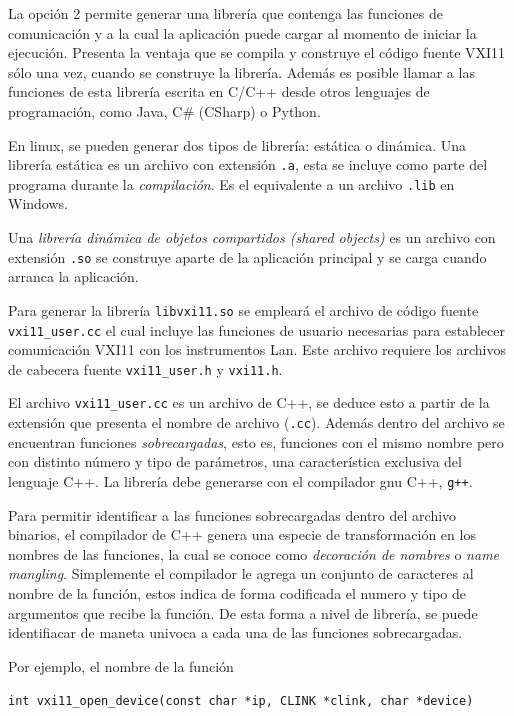 \documentclass[paper=letter,oneside,fontsize=11pt, parskip=full]{scrartcl}
\newenvironment{code}
	{\begin{adjustwidth}{1.0cm}{0.0cm}\ttfamily}
	{\end{adjustwidth}}
\begin{document}
	La opción 2 permite generar una librería que contenga las funciones de comunicación y a la cual la aplicación puede cargar al momento de iniciar la ejecución. Presenta la ventaja que se compila y construye el código fuente VXI11 sólo una vez, cuando se construye la librería. Además es posible llamar a las funciones de esta librería escrita en C/C++ desde otros lenguajes de programación, como Java, C\# (CSharp) o Python.
	
	En linux, se pueden generar dos tipos de librería: estática o dinámica. Una librería estática es un archivo con extensión \texttt{.a}, esta se incluye como parte del programa durante la \emph{compilación}. Es el equivalente a un archivo \texttt{.lib} en Windows.
	
	Una \emph{librería dinámica de objetos compartidos (shared objects)} es un archivo con extensión \texttt{.so} se construye aparte de la aplicación principal y se carga cuando arranca la aplicación.
	
	Para generar la librería \texttt{libvxi11.so} se empleará el archivo de código fuente \texttt{vxi11\_user.cc} el cual incluye las funciones de usuario necesarias para establecer comunicación VXI11 con los instrumentos Lan. Este archivo requiere los archivos de cabecera fuente \texttt{vxi11\_user.h} y \texttt{vxi11.h}. 
	
	El archivo \texttt{vxi11\_user.cc} es un archivo de C++, se deduce esto a partir de la extensión que presenta el nombre de archivo (\texttt{.cc}). Además dentro del archivo se encuentran funciones \emph{sobrecargadas}, esto es, funciones con el mismo nombre pero con distinto número y tipo de parámetros, una característica exclusiva del lenguaje C++. La librería debe generarse con el compilador gnu C++, \texttt{g++}.
	
	Para permitir identificar a las funciones sobrecargadas dentro del archivo binarios, el compilador de C++ genera una especie de transformación en los nombres de las funciones, la cual se conoce como \emph{decoración de nombres} o \emph{name mangling}. Simplemente el compilador le agrega un conjunto de caracteres al nombre de la función, estos indica de forma codificada el numero y tipo de argumentos que recibe la función. De esta forma a nivel de librería, se puede identifiacar de maneta univoca a cada una de las funciones sobrecargadas.
	
	Por ejemplo, el nombre de la función 
	
	\begin{code}
		\texttt{int vxi11\_open\_device(const char *ip, CLINK *clink, char *device) } 
	\end{code}
	
\end{document}
